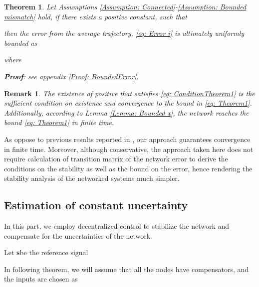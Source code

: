 \documentclass[conference]{IEEEtran}
\newtheorem{theo}{Theorem}
\newtheorem{remark}{Remark}
\def\bs{\mbox{{\bf s}}}
\begin{document}
	\begin{theo}\label{Theorem: BoundedError}
	 Let Assumptions \ref{Assumption: Connected}-\ref{Assumption: Bounded mismatch} hold, if there exists a positive constant,  such that
		
	 then the error from the average trajectory, \eqref{eq: Error i} is ultimately uniformly bounded as
	 
	 where 
	 
{\bf Proof}: see appendix \ref{Proof: BoundedError}.
	\end{theo}
		\begin{remark}
		The existence of positive  that satisfies \eqref{eq: ConditionTheorem1} is the sufficient condition on existence and convergence to the bound in \eqref{eq: Theorem1}. Additionally, according to Lemma \ref{Lemma: Bounded x}, the network reaches the bound \eqref{eq: Theorem1} in finite time.
		\end{remark}
		As oppose to previous results reported in \cite{Restrepo04, Sun09, Sorrentino11, Acharyya12,Manaffam15}, our approach guarantees convergence in finite time. Moreover, although conservative, the approach taken here does not require calculation of transition matrix of the network error to derive the conditions on the stability as well as the bound on the error, hence rendering the stability analysis of the networked systems much simpler. 
		
		
\subsection{Estimation of constant uncertainty}
	In this part, we employ decentralized control to stabilize the network and compensate for the uncertainties of the network.
		
		Let \bs be the reference signal
		
		
		In following theorem, we will assume that all the nodes have compensators, and the inputs are chosen as
		
\end{document}
